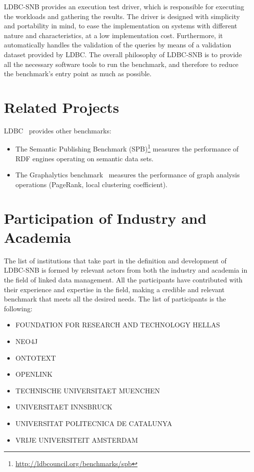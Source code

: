 LDBC-SNB provides an execution test driver, which is responsible for executing
the workloads and gathering the results. The driver is designed with simplicity
and portability in mind, to ease the implementation on systems with different
nature and characteristics, at a low implementation cost. Furthermore, it
automatically handles the validation of the queries by means of a validation
dataset provided by LDBC.  The overall philosophy of LDBC-SNB is to provide all
the necessary software tools to run the benchmark, and therefore to reduce the
benchmark's entry point as much as possible.

\section{Related Projects}

LDBC~\cite{DBLP:journals/sigmod/AnglesBLF0ENMKT14} provides other benchmarks:

\begin{itemize}
	\item The Semantic Publishing Benchmark (SPB)\footnote{\url{http://ldbcouncil.org/benchmarks/spb}} measures the performance of RDF engines operating on semantic data sets.
	\item The Graphalytics benchmark~\cite{DBLP:journals/pvldb/IosupHNHPMCCSAT16} measures the performance of graph analysis operations (\eg PageRank, local clustering coefficient).
\end{itemize}

\section{Participation of Industry and Academia}

The list of institutions that take part in the definition and development
of LDBC-SNB is formed by relevant actors from both the industry and academia in
the field of linked data management. All the participants have contributed with
their experience and expertise in the field, making a credible and relevant
benchmark that meets all the desired needs. The list of participants is the
following:

\begin{itemize}
    \item FOUNDATION FOR RESEARCH AND TECHNOLOGY HELLAS
    \item NEO4J
    \item ONTOTEXT
    \item OPENLINK
    \item TECHNISCHE UNIVERSITAET MUENCHEN
    \item UNIVERSITAET INNSBRUCK
    \item UNIVERSITAT POLITECNICA DE CATALUNYA
    \item VRIJE UNIVERSITEIT AMSTERDAM
\end{itemize}

